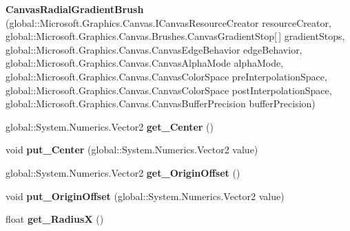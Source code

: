 \begin{DoxyCompactItemize}
{\bfseries Canvas\+Radial\+Gradient\+Brush} (global\+::\+Microsoft.\+Graphics.\+Canvas.\+I\+Canvas\+Resource\+Creator resource\+Creator, global\+::\+Microsoft.\+Graphics.\+Canvas.\+Brushes.\+Canvas\+Gradient\+Stop\mbox{[}$\,$\mbox{]} gradient\+Stops, global\+::\+Microsoft.\+Graphics.\+Canvas.\+Canvas\+Edge\+Behavior edge\+Behavior, global\+::\+Microsoft.\+Graphics.\+Canvas.\+Canvas\+Alpha\+Mode alpha\+Mode, global\+::\+Microsoft.\+Graphics.\+Canvas.\+Canvas\+Color\+Space pre\+Interpolation\+Space, global\+::\+Microsoft.\+Graphics.\+Canvas.\+Canvas\+Color\+Space post\+Interpolation\+Space, global\+::\+Microsoft.\+Graphics.\+Canvas.\+Canvas\+Buffer\+Precision buffer\+Precision)
\item 
\mbox{\label{class_microsoft_1_1_graphics_1_1_canvas_1_1_brushes_1_1_canvas_radial_gradient_brush_a43413929c2a98e600a2c1dbe5ca5bd5d}} 
global\+::\+System.\+Numerics.\+Vector2 {\bfseries get\+\_\+\+Center} ()
\item 
\mbox{\label{class_microsoft_1_1_graphics_1_1_canvas_1_1_brushes_1_1_canvas_radial_gradient_brush_a8fb60dbea8079a04d895966bf57a6cd4}} 
void {\bfseries put\+\_\+\+Center} (global\+::\+System.\+Numerics.\+Vector2 value)
\item 
\mbox{\label{class_microsoft_1_1_graphics_1_1_canvas_1_1_brushes_1_1_canvas_radial_gradient_brush_a5c218cf977932ca4601e2986eb75f50d}} 
global\+::\+System.\+Numerics.\+Vector2 {\bfseries get\+\_\+\+Origin\+Offset} ()
\item 
\mbox{\label{class_microsoft_1_1_graphics_1_1_canvas_1_1_brushes_1_1_canvas_radial_gradient_brush_ab81418298a8dbc0342347dc836ff9a7f}} 
void {\bfseries put\+\_\+\+Origin\+Offset} (global\+::\+System.\+Numerics.\+Vector2 value)
\item 
\mbox{\label{class_microsoft_1_1_graphics_1_1_canvas_1_1_brushes_1_1_canvas_radial_gradient_brush_ab3f2ca13e2e3fd0c9e7e0e4efe610986}} 
float {\bfseries get\+\_\+\+RadiusX} ()

\end{DoxyCompactItemize}
